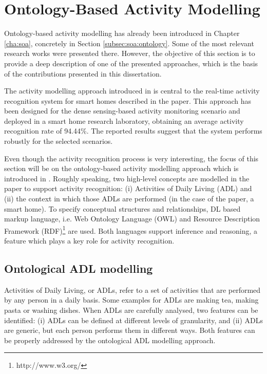 \section{Ontology-Based Activity Modelling}
\label{sec:approach:ontology}

Ontology-based activity modelling has already been introduced in Chapter \ref{cha:soa}, concretely in Section \ref{subsec:soa:ontology}. Some of the most relevant research works were presented there. However, the objective of this section is to provide a deep description of one of the presented approaches, which is the basis of the contributions presented in this dissertation.

The activity modelling approach introduced in \cite{Chen2012a} is central to the real-time activity recognition system for smart homes described in the paper. This approach has been designed for the dense sensing-based activity monitoring scenario and deployed in a smart home research laboratory, obtaining an average activity recognition rate of 94.44\%. The reported results suggest that the system performs robustly for the selected scenarios.

Even though the activity recognition process is very interesting, the focus of this section will be on the ontology-based activity modelling approach which is introduced in \cite{Chen2012a}. Roughly speaking, two high-level concepts are modelled in the paper to support activity recognition: (i) Activities of Daily Living (ADL) and (ii) the context in which those ADLs are performed (in the case of the paper, a smart home). To specify conceptual structures and relationships, DL based markup language, i.e. Web Ontology Language (OWL) and Resource Description Framework (RDF)\footnote{http://www.w3.org/} are used. Both languages support inference and reasoning, a feature which plays a key role for activity recognition. 

\subsection{Ontological ADL modelling}
Activities of Daily Living, or ADLs, refer to a set of activities that are performed by any person in a daily basis. Some examples for ADLs are making tea, making pasta or washing dishes. When ADLs are carefully analysed, two features can be identified: (i) ADLs can be defined at different levels of granularity, and (ii) ADLs are generic, but each person performs them in different ways. Both features can be properly addressed by the ontological ADL modelling approach.

